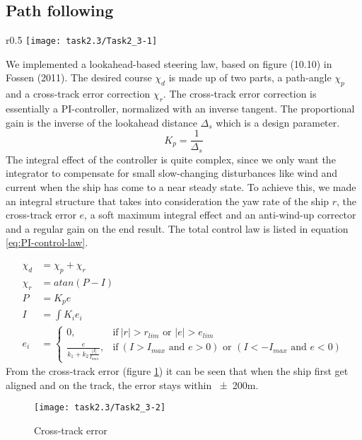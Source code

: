 \subsection{Path following}\label{subsec:prob2.2}
\begin{wrapfigure}{r}{0.5 \textwidth}
   \vspace{-30pt}
   \centering
    \texttt{[image: task2.3/Task2\_3-1]}
    \vspace{-20pt}
    \caption{Path following}
    \label{fig:2.3-path}
    \vspace{-10pt}
\end{wrapfigure}

We implemented a lookahead-based steering law, based on figure (10.10) in Fossen (2011). The desired course $\chi_d$ is made up of two parts, a path-angle $\chi_p$ and a cross-track error correction $\chi_r$. The cross-track error correction is essentially a PI-controller, normalized with an inverse tangent. The proportional gain is the inverse of the lookahead distance $\Delta_s$ which is a design parameter.
\begin{equation}
	K_p = \frac{1}{\Delta_s}
\end{equation}
The integral effect of the controller is quite complex, since we only want the integrator to compensate for small slow-changing disturbances like wind and current when the ship has come to a near steady state. To achieve this, we made an integral structure that takes into consideration the yaw rate of the ship $r$, the cross-track error $e$, a soft maximum integral effect and an anti-wind-up corrector and a regular gain on the end result. The total control law is listed in equation \ref{eq:PI-control-law}.

\begin{equation}
\begin{split}
	\chi_d &= \chi_p + \chi_r \\
	\chi_r &= atan(P - I) \\
	P &= K_p e \\
	I &= \int K_i e_i \\
	e_i &=	\begin{cases}
			0,								& \text{if}\ | r | > r_{lim} \text{ or }  | e | > e_{lim} \\
      			\frac{e}{k_1+k_2 \frac{| I |}{I_{max}}},		& \text{if}\ (I > I_{max} \text{ and } e>0) \text{ or }( I< -I_{max} \text{ and } e<0 )
      			\end{cases}
\end{split}
\label{eq:PI-control-law}
\end{equation}
From the cross-track error (figure \ref{fig:2.3-error}) it can be seen that when the ship first get aligned and on the track, the error stays within \num{\pm200}{m}.

\begin{figure}[ht]
   \centering
    \texttt{[image: task2.3/Task2\_3-2]}
    \caption{Cross-track error}
    \label{fig:2.3-error}
\end{figure}

